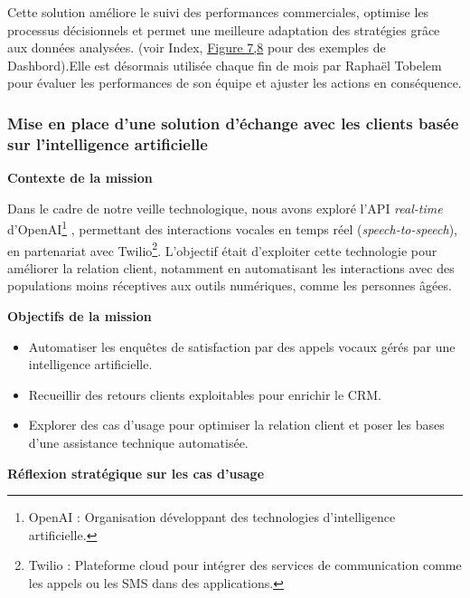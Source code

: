 Cette solution améliore le suivi des performances commerciales, optimise les processus décisionnels et permet une meilleure adaptation des stratégies grâce aux données analysées. (voir Index, \hyperref[fig:analyse-telepros]{Figure 7,8} pour des exemples de Dashbord).Elle est désormais utilisée chaque fin de mois par Raphaël Tobelem pour évaluer les performances de son équipe et ajuster les actions en conséquence.

\subsubsection{Mise en place d’une solution d’échange avec les clients basée sur l’intelligence artificielle}

\textbf{Contexte de la mission}\vspace{0.3cm}

Dans le cadre de notre veille technologique, nous avons exploré l’API \textit{real-time} d’OpenAI\footnote{OpenAI : Organisation développant des technologies d’intelligence artificielle.}
, permettant des interactions vocales en temps réel (\textit{speech-to-speech}), en partenariat avec Twilio\footnote{Twilio : Plateforme cloud pour intégrer des services de communication comme les appels ou les SMS dans des applications.}. L’objectif était d’exploiter cette technologie pour améliorer la relation client, notamment en automatisant les interactions avec des populations moins réceptives aux outils numériques, comme les personnes âgées.\vspace{0.3cm}

\textbf{Objectifs de la mission}\vspace{0.3cm}

\begin{itemize}
    \item Automatiser les enquêtes de satisfaction par des appels vocaux gérés par une intelligence artificielle.\vspace{0.3cm}
    \item Recueillir des retours clients exploitables pour enrichir le CRM.\vspace{0.3cm}
    \item Explorer des cas d’usage pour optimiser la relation client et poser les bases d’une assistance technique automatisée.\vspace{0.3cm}
\end{itemize}

\textbf{Réflexion stratégique sur les cas d’usage}\vspace{0.3cm}

